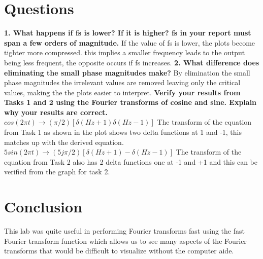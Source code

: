 \documentclass[12pt]{report}
\begin{document}
\section{Questions}
\textbf{1. What happens if fs is lower? If it is higher? fs in your report must span a few orders of
magnitude.}
\newline
If the value of fs is lower, the plots become tighter more compressed. this implies a smaller frequency leads to the output being less frequent, the opposite occurs if fs increases. \newline
\textbf{2. What difference does eliminating the small phase magnitudes make?
}
\newline
By elimination the small phase magnitudes the irrelevant values are removed leaving only the critical values, making the the plots easier to interpret. 
\newline
\textbf{Verify your results from Tasks 1 and 2 using the Fourier transforms of cosine and sine.
Explain why your results are correct.}\newline
$cos(2 \pi t) \rightarrow (\pi/2)[\delta(Hz + 1) \delta(Hz-1)]$ \newline
The transform of the equation from Task 1 as shown in the plot shows two delta functions at 1 and -1, this matches up with the derived equation. 
\newline
$5sin(2 \pi t) \rightarrow (5j\pi/2)[\delta(Hz+1)-\delta(Hz-1)]$\newline
The transform of the equation from Task 2 also has 2 delta functions one at -1 and +1 and this can be verified from the graph for task 2.
\section{Conclusion}
This lab was quite useful in performing Fourier transforms fast using the fast Fourier transform function which allows us to see many aspects of the Fourier transforms that would be difficult to visualize without the computer aide. 
\newpage
\end{document}
